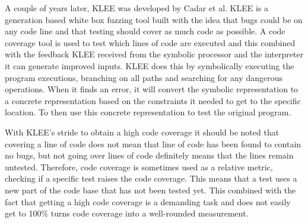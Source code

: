 A couple of years later, KLEE \cite{8KLEE} was developed by Cadar et al. KLEE is a generation based white box fuzzing tool built with the idea that bugs could be on any code line and that testing should cover as much code as possible. A code coverage tool is used to test which lines of code are executed and this combined with the feedback KLEE received from the symbolic processor and the interpreter it can generate improved inputs. KLEE does this by symbolically executing the program executions, branching on all paths and searching for any dangerous operations. When it finds an error, it will convert the symbolic representation to a concrete representation based on the constraints it needed to get to the specific location. To then use this concrete representation to test the original program.

With KLEE’s stride to obtain a high code coverage it should be noted that covering a line of code does not mean that line of code has been found to contain no bugs, but not going over lines of code definitely means that the lines remain untested. Therefore, code coverage is sometimes used as a relative metric, checking if a specific test raises the code coverage. This means that a test uses a new part of the code base that has not been tested yet. This combined with the fact that getting a high code coverage is a demanding task and does not easily get to 100\% turns code coverage into a well-rounded measurement.

